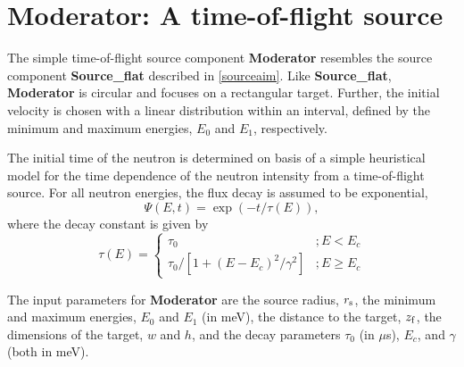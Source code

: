 \section{Moderator: A time-of-flight source}
\label{s:moderator}

The simple time-of-flight source component {\bf Moderator} resembles
the source component {\bf Source\_flat} described in \ref{sourceaim}.
Like {\bf Source\_flat}, {\bf Moderator} is circular and focuses
on a rectangular target. Further, the initial velocity is chosen
with a linear distribution within an interval, defined by the
minimum and maximum energies, $E_0$ and $E_1$,
respectively.

The initial time of the neutron is determined on basis of a
simple heuristical model for the time dependence of the
neutron intensity from a time-of-flight source.
For all neutron energies, the flux decay is assumed to be exponential,
\begin{equation}
\Psi(E,t) = \exp(-t/\tau(E)) ,
\end{equation}
where the decay constant is given by
\begin{equation}
\tau(E) = \left\{
\begin{array}{cc}
 \tau_0                               & ; E<E_c \\
 \tau_0 / [ 1 + (E-E_c)^2/\gamma^2 ]  & ; E \geq E_c
\end{array}
\right.
\end{equation}

The input parameters for {\bf Moderator} are the source radius, $r_{\rm s}$,
the minimum and maximum energies, $E_0$ and $E_1$ (in meV),
the distance to the target, $z_{\rm f}$, the dimensions of the target,
$w$ and $h$, and the decay parameters
$\tau_0$ (in $\mu$s), $E_c$, and $\gamma$ (both in meV).